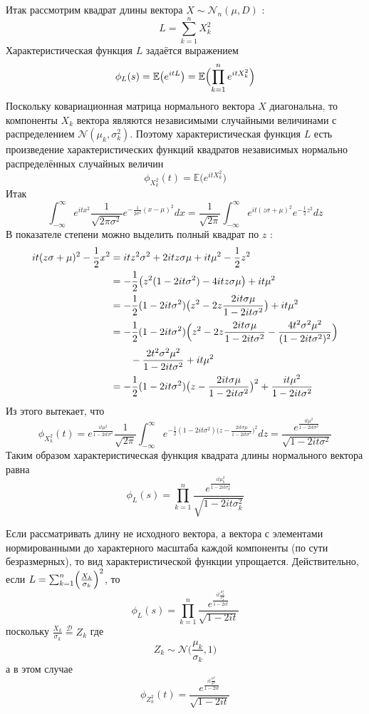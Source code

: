 \documentclass[a4paper]{article}
\newcommand{\Ncal}{\mathcal{N}}
\newcommand{\Dcal}{\mathcal{D}}
\newcommand{\ex}[0]{{\mathbb{E}}}
\begin{document}
Итак рассмотрим квадрат длины вектора $X\sim \Ncal_n(\mu,D)$ :
\[L = \sum_{k=1}^n X_k^2\]
Характеристическая функция $L$ задаётся выражением
\[
\phi_L(s)
= \ex\bigl(e^{itL}\bigr)
= \ex\Bigl(\prod_{k=1}^n e^{i t X_k^2}\Bigr)
\]
Поскольку ковариационная матрица нормального вектора $X$ диагональна, то компоненты
$X_k$ вектора являются независимыми случайными величинами с распределением
$\Ncal(\mu_k,\sigma_k^2)$. Поэтому характеристическая функция $L$ есть произведение
характеристических функций квадратов независимых нормально распределённых
случайных величин
\[\phi_{X_k^2}(t) = \ex\bigl(e^{it X_k^2}\bigr)\]
Итак
\[
\int_{-\infty}^\infty e^{itx^2} \frac{1}{\sqrt{2\pi\sigma^2}} e^{-\frac{1}{2\sigma^2}(x-\mu)^2} dx
	= \frac{1}{\sqrt{2\pi}} \int_{-\infty}^\infty e^{it(z\sigma+\mu)^2} e^{-\frac{1}{2}z^2} dz
\]
В показателе степени можно выделить полный квадрат по $z$ :
\begin{align*}
it(z\sigma+\mu)^2 - \frac{1}{2}x^2
	&= it z^2\sigma^2 + 2itz\sigma\mu + it\mu^2 -\frac{1}{2}z^2 \\
	&=  -\frac{1}{2}\bigl(z^2(1 - 2 it \sigma^2) - 4itz\sigma\mu\bigr) + it\mu^2\\
	&=  -\frac{1}{2}(1 - 2 it \sigma^2)\bigl(z^2 - 2z\frac{2it\sigma\mu}{1 - 2 it \sigma^2}\bigr) + it\mu^2\\
	&=  -\frac{1}{2}(1 - 2 it \sigma^2)\Bigl(
			z^2 - 2z\frac{2it\sigma\mu}{1 - 2it\sigma^2} -\frac{4t^2\sigma^2\mu^2}{(1 - 2it\sigma^2)^2}
		\Bigr) \\
	&\quad\quad- \frac{2t^2\sigma^2\mu^2}{1 - 2it\sigma^2} + it\mu^2\\
	&=  -\frac{1}{2}(1 - 2it\sigma^2)\bigl(z - \frac{2it\sigma\mu}{1 - 2it\sigma^2}\bigr)^2
		+ \frac{it\mu^2}{1 - 2it\sigma^2}
\end{align*}
Из этого вытекает, что 
\[
\phi_{X_k^2}(t)
= e^\frac{it\mu^2}{1 - 2it\sigma^2} \frac{1}{\sqrt{2\pi}}
	\int_{-\infty}^\infty e^{-\frac{1}{2}(1 - 2it\sigma^2)\bigl(z - \frac{2it\sigma\mu}{1 - 2it\sigma^2}\bigr)^2} dz
= \frac{e^\frac{it\mu^2}{1 - 2it\sigma^2}}{\sqrt{1 - 2it\sigma^2}}
\]
Таким образом характеристическая функция квадрата длины нормального вектора равна
\[\phi_L(s) = \prod_{k=1}^n \frac{e^\frac{it\mu_k^2}{1 - 2it\sigma_k^2}}{\sqrt{1 - 2it\sigma_k^2}}\]

Если рассматривать длину не исходного вектора, а вектора с элементами нормированными
до характерного масштаба каждой компоненты (по сути безразмерных), то вид
характеристической функции упрощается. Действительно, если
$L = \sum_{k=1}^n \Bigl(\frac{X_k}{\sigma_k}\Bigr)^2$, то
\[\phi_L(s) = \prod_{k=1}^n \frac{e^\frac{it\frac{\mu_k^2}{\sigma^2_k}}{1 - 2it}}{\sqrt{1 - 2it}}\]
поскольку $\frac{X_k}{\sigma_k} \overset{\Dcal}{=} Z_k$ где
\[Z_k \sim\Ncal\bigl(\frac{\mu_k}{\sigma_k},1\bigr)\]
а в этом случае
\[
\phi_{Z_k^2}(t) = \frac{e^\frac{it\frac{\mu^2}{\sigma^2}}{1 - 2it}}{\sqrt{1 - 2it}}
\]
\end{document}
